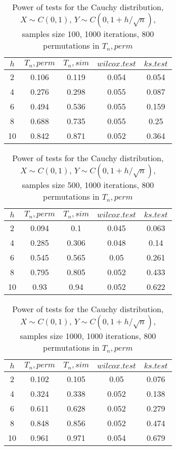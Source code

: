 \documentclass[final,11pt,3p]{elsarticle}
\begin{document}
\begin{longtable}{|c|c|c|c|c|}
  \caption{Power of tests for the Cauchy distribution, \\
           $X\sim C(0,1)$, $Y\sim C(0, 1 + h/\sqrt{n})$, \\
           samples size 100, 1000 iterations, 800 permutations in $T_n, perm$} \\
  \hline
  $h$ & $T_n, perm$ & $T_n, sim$ & $wilcox.test$ & $ks.test$ \\
  \hline
  2 & 0.106 & 0.119 & 0.054 & 0.054 \\
  4 & 0.276 & 0.298 & 0.055 & 0.087 \\
  6 & 0.494 & 0.536 & 0.055 & 0.159 \\
  8 & 0.688 & 0.735 & 0.055 & 0.25 \\
  10 & 0.842 & 0.871 & 0.052 & 0.364 \\
  \hline
\end{longtable}

\begin{longtable}{|c|c|c|c|c|}
  \caption{Power of tests for the Cauchy distribution, \\
           $X\sim C(0,1)$, $Y\sim C(0, 1 + h/\sqrt{n})$, \\
           samples size 500, 1000 iterations, 800 permutations in $T_n, perm$} \\
  \hline
  $h$ & $T_n, perm$ & $T_n, sim$ & $wilcox.test$ & $ks.test$ \\
  \hline
  2 & 0.094 & 0.1 & 0.045 & 0.063 \\
  4 & 0.285 & 0.306 & 0.048 & 0.14 \\
  6 & 0.545 & 0.565 & 0.05 & 0.261 \\
  8 & 0.795 & 0.805 & 0.052 & 0.433 \\
  10 & 0.93 & 0.94 & 0.052 & 0.622 \\
  \hline
\end{longtable}

\begin{longtable}{|c|c|c|c|c|}
  \caption{Power of tests for the Cauchy distribution, \\
           $X\sim C(0,1)$, $Y\sim C(0, 1 + h/\sqrt{n})$, \\
           samples size 1000, 1000 iterations, 800 permutations in $T_n, perm$} \\
  \hline
  $h$ & $T_n, perm$ & $T_n, sim$ & $wilcox.test$ & $ks.test$ \\
  \hline
  2 & 0.102 & 0.105 & 0.05 & 0.076 \\
  4 & 0.324 & 0.338 & 0.052 & 0.138 \\
  6 & 0.611 & 0.628 & 0.052 & 0.279 \\
  8 & 0.848 & 0.856 & 0.052 & 0.474 \\
  10 & 0.961 & 0.971 & 0.054 & 0.679 \\
  \hline
\end{longtable}
\end{document}
